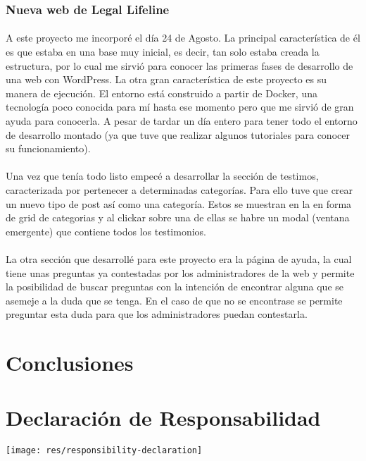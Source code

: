 \documentclass[10pt, a4paper,spanish]{article}
\begin{document}
            \subsubsection{Nueva web de Legal Lifeline}

                \paragraph{}
                A este proyecto me incorporé el día 24 de Agosto. La principal característica de él es que estaba en una base muy inicial, es decir, tan solo estaba creada la estructura, por lo cual me sirvió para conocer las primeras fases de desarrollo de una web con WordPress. La otra gran característica de este proyecto es su manera de ejecución. El entorno está construido a partir de Docker, una tecnología poco conocida para mí hasta ese momento pero que me sirvió de gran ayuda para conocerla. A pesar de tardar un día entero para tener todo el entorno de desarrollo montado (ya que tuve que realizar algunos tutoriales para conocer su funcionamiento).

                \paragraph{}
                Una vez que tenía todo listo empecé a desarrollar la sección de testimos, caracterizada por pertenecer a determinadas categorías. Para ello tuve que crear un nuevo tipo de post así como una categoría. Estos se muestran en la en forma de grid de categorias y al clickar sobre una de ellas se habre un modal (ventana emergente) que contiene todos los testimonios.

                \paragraph{}
                La otra sección que desarrollé para este proyecto era la página de ayuda, la cual tiene unas preguntas ya contestadas por los administradores de la web y permite la posibilidad de buscar preguntas con la intención de encontrar alguna que se asemeje a la duda que se tenga. En el caso de que no se encontrase se permite preguntar esta duda para que los administradores puedan contestarla.


    \section{Conclusiones}



    \newpage
    \section{Declaración de Responsabilidad}

        \texttt{[image: res/responsibility-declaration]}
\end{document}
